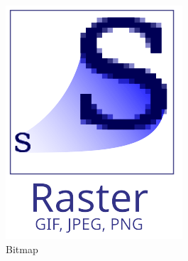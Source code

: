 \begin{figure}[!ht]
     \centering
     \begin{subfigure}[b]{0.3\textwidth}
         \centering
         \includegraphics[width=\textwidth]{figures/sample/512px-Bitmap_VS_SVG - a.png}
         \caption{Bitmap}
         \label{fig: subfig bitmap}
     \end{subfigure}
     \begin{subfigure}[b]{0.3\textwidth}
         \centering

\end{subfigure}
\end{figure}
